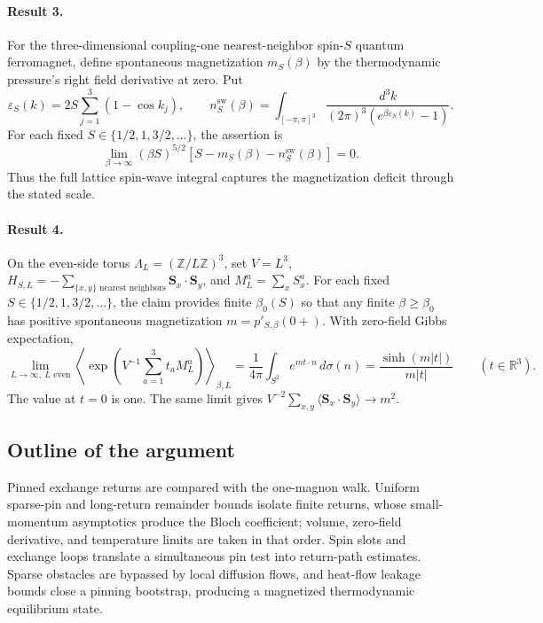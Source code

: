 \documentclass[11pt]{article}
\begin{document}
\paragraph{Result 3.} For the three-dimensional coupling-one nearest-neighbor spin-\(S\) quantum ferromagnet, define spontaneous magnetization \(m_S(\beta)\) by the thermodynamic pressure's right field derivative at zero. Put
\[
 \varepsilon_S(k)=2S\sum_{j=1}^3(1-\cos k_j),\qquad
 n_S^{\mathrm{sw}}(\beta)=\int_{[-\pi,\pi]^3}
 \frac{d^3k}{(2\pi)^3(e^{\beta\varepsilon_S(k)}-1)}.
\]
For each fixed $S\in\{1/2,1,3/2,\ldots\}$, the assertion is
\[
 \lim_{\beta\to\infty}(\beta S)^{5/2}
 [S-m_S(\beta)-n_S^{\mathrm{sw}}(\beta)]=0.
\]
Thus the full lattice spin-wave integral captures the magnetization deficit through the stated scale.

\paragraph{Result 4.} On the even-side torus \(\Lambda_L=(\mathbb Z/L\mathbb Z)^3\), set \(V=L^3\), \(H_{S,L}=-\sum_{\{x,y\}\text{ nearest neighbors}}\boldsymbol S_x\cdot\boldsymbol S_y\), and \(M_L^a=\sum_xS_x^a\). For each fixed $S\in\{1/2,1,3/2,\ldots\}$, the claim provides finite \(\beta_0(S)\) so that any finite \(\beta\ge\beta_0\) has positive spontaneous magnetization \(m=p'_{S,\beta}(0+)\). With zero-field Gibbs expectation,
\[
 \lim_{L\to\infty,\ L\text{ even}}
 \left\langle\exp\!\left(V^{-1}\sum_{a=1}^3t_aM_L^a\right)\right\rangle_{\beta,L}
 =\frac1{4\pi}\int_{S^2}e^{m t\cdot n}\,d\sigma(n)
 =\frac{\sinh(m|t|)}{m|t|}\qquad(t\in\mathbb R^3).
\]
The value at \(t=0\) is one. The same limit gives \(V^{-2}\sum_{x,y}\langle\boldsymbol S_x\cdot\boldsymbol S_y\rangle\to m^2\).

\subsection{Outline of the argument}
Pinned exchange returns are compared with the one-magnon walk. Uniform sparse-pin and long-return remainder bounds isolate finite returns, whose small-momentum asymptotics produce the Bloch coefficient; volume, zero-field derivative, and temperature limits are taken in that order. Spin slots and exchange loops translate a simultaneous pin test into return-path estimates. Sparse obstacles are bypassed by local diffusion flows, and heat-flow leakage bounds close a pinning bootstrap, producing a magnetized thermodynamic equilibrium state.
\end{document}
